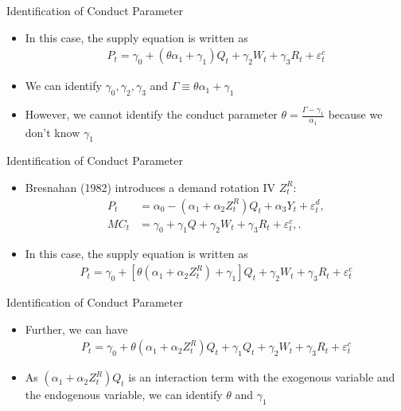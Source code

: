\documentclass[aspectratio = 169]{beamer}
\theoremstyle{definition}
\begin{document}
\begin{frame}{Identification of Conduct Parameter}
    \begin{itemize}
        \item In this case, the supply equation is written as
        \begin{align}
            P_t = \gamma_0 + (\theta\alpha_1 + \gamma_1) Q_t   + \gamma_2 W_{t} + \gamma_3 R_t + \varepsilon^{c}_{t}
        \end{align}
        \item We can identify $ \gamma_0, \gamma_2, \gamma_3$ and $\Gamma \equiv \theta\alpha_1 + \gamma_1$
        \item However, we cannot identify the conduct parameter $\theta = \frac{\Gamma - \gamma_1}{\alpha_1}$ because we don't know $\gamma_1$
    \end{itemize}
\end{frame}


\begin{frame}{Identification of Conduct Parameter}
    \begin{itemize}
        \item Bresnahan (1982) introduces a demand rotation IV $Z_t^R$:
        \begin{align}
            P_t &= \alpha_0 - (\alpha_1 + \alpha_2Z^{R}_{t})Q_t + \alpha_3 Y_t + \varepsilon^{d}_{t},\\
            MC_t &= \gamma_0  + \gamma_1 Q + \gamma_2 W_{t} + \gamma_3 R_t + \varepsilon^{c}_{t},.
        \end{align}
        \item In this case, the supply equation is written as
        \begin{align}
            P_t = \gamma_0 + [\theta(\alpha_1 + \alpha_2Z^{R}_{t})+ \gamma_1] Q_t   + \gamma_2 W_{t} + \gamma_3 R_t + \varepsilon^{c}_{t}
        \end{align}
    \end{itemize}
\end{frame}


\begin{frame}{Identification of Conduct Parameter}
    \begin{itemize}
        \item Further, we can have
        \begin{align}
            P_t = \gamma_0 + \theta(\alpha_1 +\alpha_2Z^{R}_{t})Q_t + \gamma_1 Q_t   + \gamma_2 W_{t} + \gamma_3 R_t + \varepsilon^{c}_{t}
        \end{align}
        \item As $(\alpha_1 +\alpha_2Z^{R}_{t})Q_t$ is an interaction term with the exogenous variable and the endogenous variable, we can identify $\theta$ and $\gamma_1$
    \end{itemize}
\end{frame}
\end{document}
